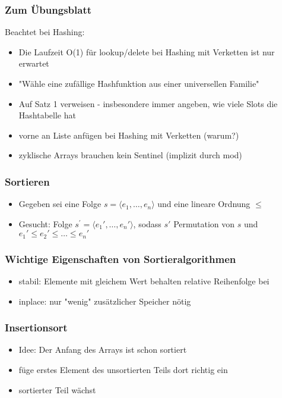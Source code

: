 

\begin{frame}
  \titlepage
\end{frame}

\begin{frame}
\frametitle{Zum Übungsblatt}
Beachtet bei Hashing:
\begin{itemize}
\item Die Laufzeit O(1) für lookup/delete bei Hashing mit Verketten ist nur erwartet
\item "Wähle eine zufällige Hashfunktion aus einer universellen Familie"
\item Auf Satz 1 verweisen - insbesondere immer angeben, wie viele Slots die Hashtabelle hat
\item vorne an Liste anfügen bei Hashing mit Verketten (warum?)
\item zyklische Arrays brauchen kein Sentinel (implizit durch mod)
\end{itemize}
\end{frame}

\begin{frame}
\frametitle{Sortieren}
\begin{itemize}
\item Gegeben sei eine Folge $s=\langle e_1,\ldots,e_n\rangle$ und eine lineare Ordnung $\leq$
\item Gesucht: Folge $s^\prime=\langle e_1\prime,\ldots,e_n\prime\rangle$, sodass $s\prime$ Permutation von $s$ und $e_1\prime\leq e_2\prime\leq\ldots\leq e_n\prime$
\end{itemize}
\end{frame}

\begin{frame}
\frametitle{Wichtige Eigenschaften von Sortieralgorithmen}
\begin{itemize}
\item stabil: Elemente mit gleichem Wert behalten relative Reihenfolge bei
\item inplace: nur "wenig" zusätzlicher Speicher nötig
\end{itemize}
\end{frame}

\begin{frame}
\frametitle{Insertionsort}
\begin{itemize}
\item Idee: Der Anfang des Arrays ist schon sortiert
\item füge erstes Element des unsortierten Teils dort richtig ein
\item sortierter Teil wächst
\end{itemize}
\end{frame}

